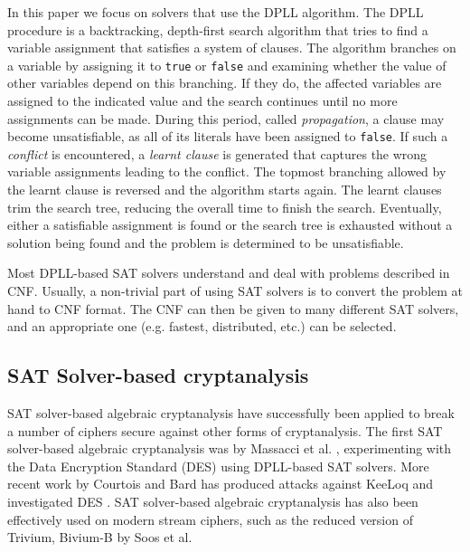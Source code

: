 \documentclass{llncs}
\begin{document}
In this paper we focus on solvers that use the DPLL algorithm. The DPLL procedure is a backtracking, depth-first search algorithm that tries to find a variable assignment that satisfies a system of clauses. The algorithm branches on a variable by assigning it to \texttt{true} or \texttt{false} and examining whether the value of other variables depend on this branching. If they do, the affected variables are assigned to the indicated value and the search continues until no more assignments can be made. During this period, called \emph{propagation}, a clause may become unsatisfiable, as all of its literals have been assigned to \texttt{false}. If such a \emph{conflict} is encountered, a \emph{learnt clause} is generated that captures the wrong variable assignments leading to the conflict. The topmost branching allowed by the learnt clause is reversed and the algorithm starts again. The learnt clauses trim the search tree, reducing the overall time to finish the search. Eventually, either a satisfiable assignment is found or the search tree is exhausted without a solution being found and the problem is determined to be unsatisfiable.

Most DPLL-based SAT solvers understand and deal with problems described in CNF. Usually, a non-trivial part of using SAT solvers is to convert the problem at hand to CNF format. The CNF can then be given to many different SAT solvers, and an appropriate one (e.g. fastest, distributed, etc.) can be selected.

\subsection{SAT Solver-based cryptanalysis}
SAT solver-based algebraic cryptanalysis have successfully been applied to break a number of ciphers secure against other forms of cryptanalysis. The first SAT solver-based algebraic cryptanalysis was by Massacci et al. \cite{Massacci00logicalcryptanalysis}, experimenting with the Data Encryption Standard (DES) using DPLL-based SAT solvers. More recent work by Courtois and Bard has produced attacks against KeeLoq \cite{DBLP:conf/fse/CourtoisBW08} and investigated DES \cite{DBLP:conf/ima/CourtoisB07}. SAT solver-based algebraic cryptanalysis has also been effectively used on modern stream ciphers, such as the reduced version of Trivium, Bivium-B \cite{DBLP:conf/sat/SoosNC09} by Soos et al.
\end{document}
